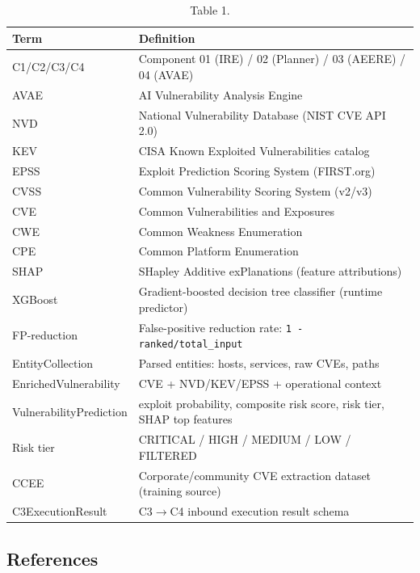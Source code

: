 \documentclass[10pt,journal,onecolumn]{IEEEtran}
\begin{document}
\begin{table}[h]
\caption{Table 1.}
\label{tab:t1}
\begin{tabularx}{\columnwidth}{l >{\raggedright\arraybackslash}X}
\toprule
\textbf{Term} & \textbf{Definition}\\
\midrule
C1/C2/C3/C4 & Component 01 (IRE) / 02 (Planner) / 03 (AEERE) / 04 (AVAE)\\
AVAE & AI Vulnerability Analysis Engine\\
NVD & National Vulnerability Database (NIST CVE API 2.0)\\
KEV & CISA Known Exploited Vulnerabilities catalog\\
EPSS & Exploit Prediction Scoring System (FIRST.org)\\
CVSS & Common Vulnerability Scoring System (v2/v3)\\
CVE & Common Vulnerabilities and Exposures\\
CWE & Common Weakness Enumeration\\
CPE & Common Platform Enumeration\\
SHAP & SHapley Additive exPlanations (feature attributions)\\
XGBoost & Gradient-boosted decision tree classifier (runtime predictor)\\
FP-reduction & False-positive reduction rate: \texttt{1 - ranked/total\_input}\\
EntityCollection & Parsed entities: hosts, services, raw CVEs, paths\\
EnrichedVulnerability & CVE + NVD/KEV/EPSS + operational context\\
VulnerabilityPrediction & exploit probability, composite risk score, risk tier, SHAP top features\\
Risk tier & CRITICAL / HIGH / MEDIUM / LOW / FILTERED\\
CCEE & Corporate/community CVE extraction dataset (training source)\\
C3ExecutionResult & C3$\rightarrow$C4 inbound execution result schema\\
\bottomrule
\end{tabularx}
\end{table}

\subsection{References}
\end{document}
